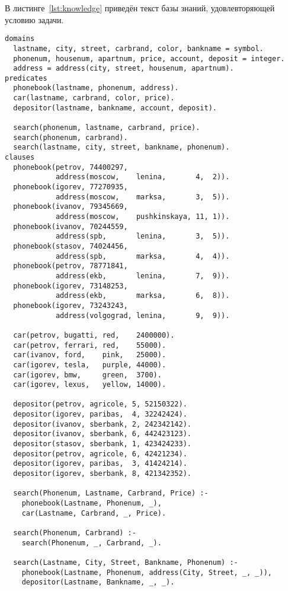 В листинге~\ref{lst:knowledge} приведён текст базы знаний, удовлевторяющей условию задачи.
\begin{lstlisting}[caption={База знаний},label={lst:knowledge}]
domains
  lastname, city, street, carbrand, color, bankname = symbol.
  phonenum, housenum, apartnum, price, account, deposit = integer.
  address = address(city, street, housenum, apartnum).
predicates
  phonebook(lastname, phonenum, address).
  car(lastname, carbrand, color, price).
  depositor(lastname, bankname, account, deposit).

  search(phonenum, lastname, carbrand, price).
  search(phonenum, carbrand).
  search(lastname, city, street, bankname, phonenum).
clauses
  phonebook(petrov, 74400297,
            address(moscow,    lenina,       4,  2)).
  phonebook(igorev, 77270935,
            address(moscow,    marksa,       3,  5)).
  phonebook(ivanov, 79345669,
            address(moscow,    pushkinskaya, 11, 1)).
  phonebook(ivanov, 70244559,
            address(spb,       lenina,       3,  5)).
  phonebook(stasov, 74024456,
            address(spb,       marksa,       4,  4)).
  phonebook(petrov, 78771841,
            address(ekb,       lenina,       7,  9)).
  phonebook(igorev, 73148253,
            address(ekb,       marksa,       6,  8)).
  phonebook(igorev, 73243243,
            address(volgograd, lenina,       9,  9)).

  car(petrov, bugatti, red,    2400000).
  car(petrov, ferrari, red,    55000).
  car(ivanov, ford,    pink,   25000).
  car(igorev, tesla,   purple, 44000).
  car(igorev, bmw,     green,  3700).
  car(igorev, lexus,   yellow, 14000).

  depositor(petrov, agricole, 5, 52150322).
  depositor(igorev, paribas,  4, 32242424).
  depositor(ivanov, sberbank, 2, 242342142).
  depositor(ivanov, sberbank, 6, 442423123).
  depositor(stasov, sberbank, 1, 423424233).
  depositor(petrov, agricole, 6, 42421234).
  depositor(igorev, paribas,  3, 41424214).
  depositor(igorev, sberbank, 8, 421342352).

  search(Phonenum, Lastname, Carbrand, Price) :-
    phonebook(Lastname, Phonenum, _),
    car(Lastname, Carbrand, _, Price).

  search(Phonenum, Carbrand) :-
    search(Phonenum, _, Carbrand, _).

  search(Lastname, City, Street, Bankname, Phonenum) :-
    phonebook(Lastname, Phonenum, address(City, Street, _, _)),
    depositor(Lastname, Bankname, _, _).
\end{lstlisting}

